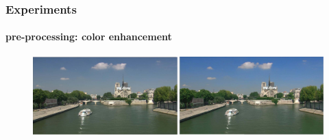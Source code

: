 \begin{frame}
\frametitle{Experiments}
\framesubtitle{pre-processing: color enhancement}
\logoCSIPCPL\mypagenum
	\begin{figure}		
		\includegraphics[width=1.0\textwidth]{figs/Proposal_fig15_TRK_colorEnhancement.pdf}
	\end{figure}
\end{frame}


\printbibliography

